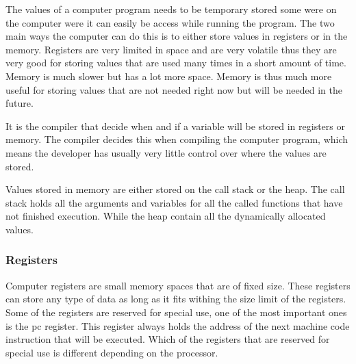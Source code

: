  

The values of a computer program needs to be temporary stored some were on the computer were it can easily be access while running the program.
The two main ways the computer can do this is to either store values in registers or in the memory.
Registers are very limited in space and are very volatile thus they are very good for storing values that are used many times in a short amount of time.
Memory is much slower but has a lot more space.
Memory is thus much more useful for storing values that are not needed right now but will be needed in the future.


It is the compiler that decide when and if a variable will be stored in registers or memory.
The compiler decides this when compiling the computer program, which means the developer has usually very little control over where the values are stored.


Values stored in memory are either stored on the call stack or the heap.
The call stack holds all the arguments and variables for all the called functions that have not finished execution.
While the heap contain all the dynamically allocated values.


\subsubsection{Registers}
Computer registers are small memory spaces that are of fixed size.
These registers can store any type of data as long as it fits withing the size limit of the registers.
Some of the registers are reserved for special use, one of the most important ones is the \acrfull{pc} register.
This register always holds the address of the next machine code instruction that will be executed.
Which of the registers that are reserved for special use is different depending on the processor.


